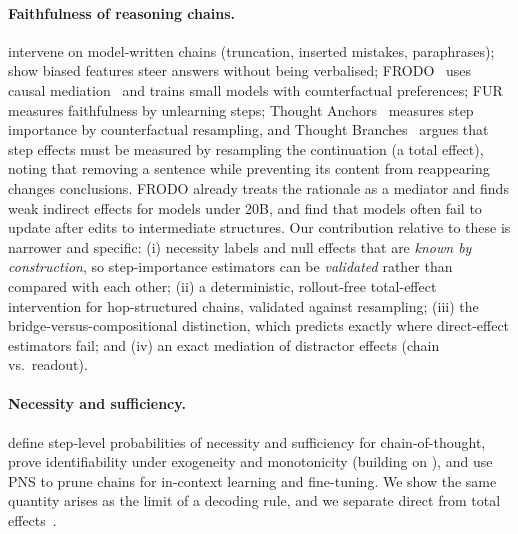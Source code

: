 \documentclass[11pt]{article}
\begin{document}
\paragraph{Faithfulness of reasoning chains.}
\citet{lanham2023faithfulness} intervene on model-written chains (truncation, inserted mistakes,
paraphrases); \citet{turpin2023unfaithful} show biased features steer answers without being
verbalised; FRODO~\citep{paul2024frodo} uses causal mediation~\citep{vig2020mediation} and trains
small models with counterfactual preferences; FUR~\citep{tutek2025fur} measures faithfulness by
unlearning steps; Thought Anchors~\citep{bogdan2025anchors} measures step importance by
counterfactual resampling, and Thought Branches~\citep{macar2026branches} argues that step
effects must be measured by resampling the continuation (a total effect), noting that removing a
sentence while preventing its content from reappearing changes conclusions. FRODO already treats
the rationale as a mediator and finds weak indirect effects for models under 20B, and
\citet{somov2026breaking} find that models often fail to update after edits to intermediate
structures. Our contribution relative to these is narrower and specific: (i) necessity labels and
null effects that are \emph{known by construction}, so step-importance estimators can be
\emph{validated} rather than compared with each other; (ii) a deterministic, rollout-free
total-effect intervention for hop-structured chains, validated against resampling; (iii) the
bridge-versus-compositional distinction, which predicts exactly where direct-effect estimators
fail; and (iv) an exact mediation of distractor effects (chain vs.\ readout).

\paragraph{Necessity and sufficiency.} \citet{yu2025pns} define step-level probabilities of
necessity and sufficiency for chain-of-thought, prove identifiability under exogeneity and
monotonicity (building on \citet{tian2000probabilities,pearl2009causality}), and use PNS to prune
chains for in-context learning and fine-tuning. We show the same quantity arises as the limit of a
decoding rule, and we separate direct from total effects~\citep{pearl2001direct}.
\end{document}
